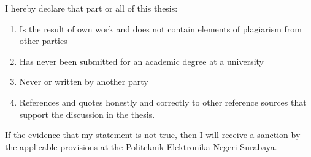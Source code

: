 
\begin{declaration}

I hereby declare that part or all of this thesis:

\begin{enumerate}
    \item Is the result of own work and does not contain elements of plagiarism from other parties
    \item  Has never been submitted for an academic degree at a university
    \item Never or written by another party
    \item References and quotes honestly and correctly to other reference sources that support the discussion in the thesis.
\end{enumerate}


If the evidence that my statement is not true, then I will receive a sanction by the applicable provisions at the Politeknik Elektronika Negeri Surabaya.


\end{declaration}


